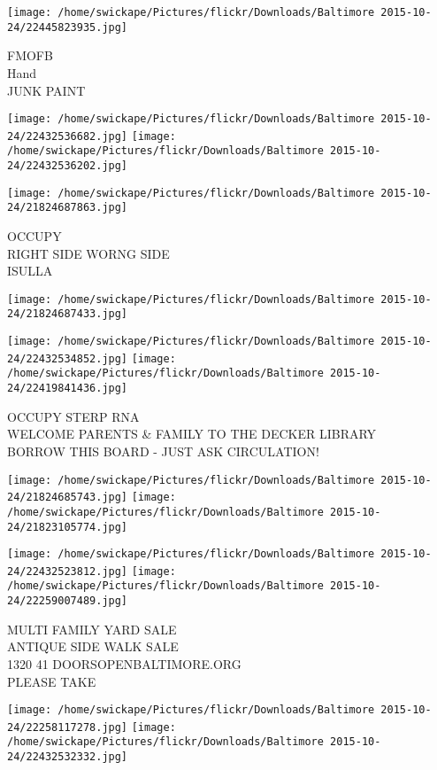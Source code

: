 \documentclass[10pt,letterpaper]{article}
\begin{document}
\vspace{0.25in}
\texttt{[image: /home/swickape/Pictures/flickr/Downloads/Baltimore 2015-10-24/22445823935.jpg]}

FMOFB\\
Hand\\
JUNK PAINT
\pagebreak

\texttt{[image: /home/swickape/Pictures/flickr/Downloads/Baltimore 2015-10-24/22432536682.jpg]}
\texttt{[image: /home/swickape/Pictures/flickr/Downloads/Baltimore 2015-10-24/22432536202.jpg]}

\vspace{0.25in}
\texttt{[image: /home/swickape/Pictures/flickr/Downloads/Baltimore 2015-10-24/21824687863.jpg]}

OCCUPY\\
RIGHT SIDE WORNG SIDE\\
ISULLA
\pagebreak

\texttt{[image: /home/swickape/Pictures/flickr/Downloads/Baltimore 2015-10-24/21824687433.jpg]}

\vspace{0.25in}
\texttt{[image: /home/swickape/Pictures/flickr/Downloads/Baltimore 2015-10-24/22432534852.jpg]}
\texttt{[image: /home/swickape/Pictures/flickr/Downloads/Baltimore 2015-10-24/22419841436.jpg]}

OCCUPY STERP RNA\\
WELCOME PARENTS \& FAMILY TO THE DECKER LIBRARY\\
BORROW THIS BOARD {-} JUST ASK CIRCULATION!
\pagebreak

\texttt{[image: /home/swickape/Pictures/flickr/Downloads/Baltimore 2015-10-24/21824685743.jpg]}
\texttt{[image: /home/swickape/Pictures/flickr/Downloads/Baltimore 2015-10-24/21823105774.jpg]}

\texttt{[image: /home/swickape/Pictures/flickr/Downloads/Baltimore 2015-10-24/22432523812.jpg]}
\texttt{[image: /home/swickape/Pictures/flickr/Downloads/Baltimore 2015-10-24/22259007489.jpg]}

MULTI FAMILY YARD SALE\\
ANTIQUE SIDE WALK SALE\\
1320 41 DOORSOPENBALTIMORE.ORG\\
PLEASE TAKE
\pagebreak

\texttt{[image: /home/swickape/Pictures/flickr/Downloads/Baltimore 2015-10-24/22258117278.jpg]}
\texttt{[image: /home/swickape/Pictures/flickr/Downloads/Baltimore 2015-10-24/22432532332.jpg]}
\end{document}
